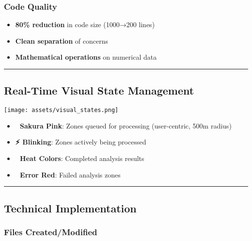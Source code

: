 \documentclass[
  letterpaper,
  DIV=11,
  numbers=noendperiod]{scrartcl}
\providecommand{\tightlist}{%
  \setlength{\itemsep}{0pt}\setlength{\parskip}{0pt}}
\begin{document}
\subsubsection{Code Quality}\label{code-quality}

\begin{itemize}
\tightlist
\item
  \textbf{80\% reduction} in code size (1000→200 lines)
\item
  \textbf{Clean separation} of concerns
\item
  \textbf{Mathematical operations} on numerical data
\end{itemize}

\begin{center}\rule{0.5\linewidth}{0.5pt}\end{center}

\subsection{Real-Time Visual State
Management}\label{real-time-visual-state-management}

\begin{center}
\texttt{[image: assets/visual\_states.png]}
\end{center}

\begin{itemize}
\tightlist
\item
  \textbf{🌸 Sakura Pink}: Zones queued for processing (user-centric,
  500m radius)
\item
  \textbf{⚡ Blinking}: Zones actively being processed\\
\item
  \textbf{🌈 Heat Colors}: Completed analysis results
\item
  \textbf{🔴 Error Red}: Failed analysis zones
\end{itemize}

\begin{center}\rule{0.5\linewidth}{0.5pt}\end{center}

\subsection{Technical Implementation}\label{technical-implementation}

\subsubsection{Files Created/Modified}\label{files-createdmodified}
\end{document}
